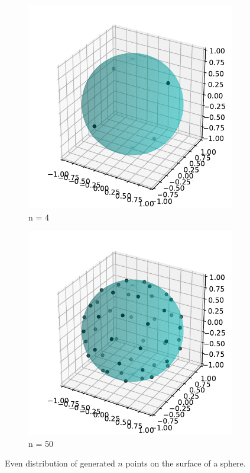 \documentclass[a4paper, 12pt]{article}
\begin{document}
\begin{figure}[!ht]
	\centering
	\begin{subfigure}{.5\textwidth}
		\centering
		\includegraphics[scale=0.75]{../images/generated2.pdf}
		\caption{n = 4}
	\end{subfigure}%
	\begin{subfigure}{.5\textwidth}
		\centering
		\includegraphics[scale=0.75]{../images/generated1.pdf}
		\caption{n = 50}
	\end{subfigure}%
    \caption{Even distribution of generated $n$ points on the surface of a sphere.}
	
\end{figure}
\end{document}
